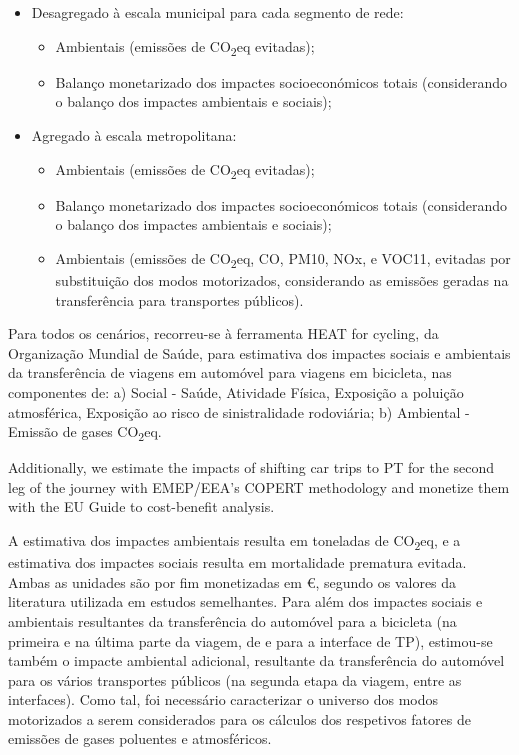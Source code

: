 \documentclass[runningheads]{llncs}
\providecommand{\tightlist}{%
  \setlength{\itemsep}{0pt}\setlength{\parskip}{0pt}}
\begin{document}
\begin{itemize}
\tightlist
\item
  Desagregado à escala municipal para cada segmento de rede:

  \begin{itemize}
  \tightlist
  \item
    Ambientais (emissões de CO\textsubscript{2}eq evitadas);
  \item
    Balanço monetarizado dos impactes socioeconómicos totais
    (considerando o balanço dos impactes ambientais e sociais);
  \end{itemize}
\item
  Agregado à escala metropolitana:

  \begin{itemize}
  \tightlist
  \item
    Ambientais (emissões de CO\textsubscript{2}eq evitadas);
  \item
    Balanço monetarizado dos impactes socioeconómicos totais
    (considerando o balanço dos impactes ambientais e sociais);
  \item
    Ambientais (emissões de CO\textsubscript{2}eq, CO, PM10, NOx, e
    VOC11, evitadas por substituição dos modos motorizados, considerando
    as emissões geradas na transferência para transportes públicos).
  \end{itemize}
\end{itemize}

Para todos os cenários, recorreu-se à ferramenta HEAT for cycling, da
Organização Mundial de Saúde, para estimativa dos impactes sociais e
ambientais da transferência de viagens em automóvel para viagens em
bicicleta, nas componentes de: a) Social - Saúde, Atividade Física,
Exposição a poluição atmosférica, Exposição ao risco de sinistralidade
rodoviária; b) Ambiental - Emissão de gases CO\textsubscript{2}eq.

Additionally, we estimate the impacts of shifting car trips to PT for
the second leg of the journey with EMEP/EEA's COPERT methodology and
monetize them with the EU Guide to cost-benefit analysis.

A estimativa dos impactes ambientais resulta em toneladas de
CO\textsubscript{2}eq, e a estimativa dos impactes sociais resulta em
mortalidade prematura evitada. Ambas as unidades são por fim monetizadas
em €, segundo os valores da literatura utilizada em estudos semelhantes.
Para além dos impactes sociais e ambientais resultantes da transferência
do automóvel para a bicicleta (na primeira e na última parte da viagem,
de e para a interface de TP), estimou-se também o impacte ambiental
adicional, resultante da transferência do automóvel para os vários
transportes públicos (na segunda etapa da viagem, entre as interfaces).
Como tal, foi necessário caracterizar o universo dos modos motorizados a
serem considerados para os cálculos dos respetivos fatores de emissões
de gases poluentes e atmosféricos.
\end{document}
